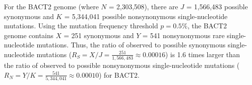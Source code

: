 For the BACT2 genome
(where $N$ = 2,303,508),
there are $J$ = 1,566,483 possible synonymous and
$K$ = 5,344,041 possible nonsynonymous single-nucleotide mutations.
%
Using the mutation frequency threshold $p = 0.5\%$,
the BACT2 genome contains
$X$ = 251 synonymous and
$Y$ = 541 nonsynonymous rare single-nucleotide mutations.
%
Thus, the ratio of observed to possible synonymous single-nucleotide mutations
($R_S = X / J = \frac{251}{1,566,483}
\approx 0.00016$)
is 1.6 times larger than the ratio of observed to possible nonsynonymous single-nucleotide mutations
($R_N = Y / K = \frac{541}{5,344,041}
\approx 0.00010$)
for BACT2.
\endinput